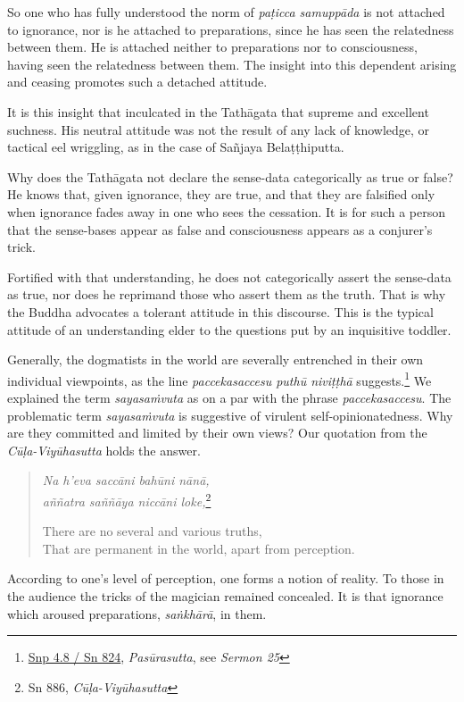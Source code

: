 So one who has fully understood the norm of \emph{paṭicca samuppāda} is not attached to ignorance, nor is he attached to preparations, since he has seen the relatedness between them. He is attached neither to preparations nor to consciousness, having seen the relatedness between them. The insight into this dependent arising and ceasing promotes such a detached attitude.

It is this insight that inculcated in the Tathāgata that supreme and excellent suchness. His neutral attitude was not the result of any lack of knowledge, or tactical eel wriggling, as in the case of Sañjaya Belaṭṭhiputta.

Why does the Tathāgata not declare the sense-data categorically as true or false? He knows that, given ignorance, they are true, and that they are falsified only when ignorance fades away in one who sees the cessation. It is for such a person that the sense-bases appear as false and consciousness appears as a conjurer's trick.

Fortified with that understanding, he does not categorically assert the sense-data as true, nor does he reprimand those who assert them as the truth. That is why the Buddha advocates a tolerant attitude in this discourse. This is the typical attitude of an understanding elder to the questions put by an inquisitive toddler.

Generally, the dogmatists in the world are severally entrenched in their own individual viewpoints, as the line \emph{paccekasaccesu puthū niviṭṭhā} suggests.\footnote{\href{https://suttacentral.net/snp4.8/pli/ms}{Snp 4.8 / Sn 824}, \emph{Pasūrasutta}, see \emph{Sermon 25}} We explained the term \emph{sayasaṁvuta} as on a par with the phrase \emph{paccekasaccesu}. The problematic term \emph{sayasaṁvuta} is suggestive of virulent self-opinionatedness. Why are they committed and limited by their own views? Our quotation from the \emph{Cūḷa-Viyūhasutta} holds the answer.

\begin{quote}
\emph{Na h'eva saccāni bahūni nānā,}\\
\emph{aññatra saññāya niccāni loke,}\footnote{Sn 886, \emph{Cūḷa-Viyūhasutta}}

There are no several and various truths,\\
That are permanent in the world, apart from perception.
\end{quote}

According to one's level of perception, one forms a notion of reality. To those in the audience the tricks of the magician remained concealed. It is that ignorance which aroused preparations, \emph{saṅkhārā}, in them.

